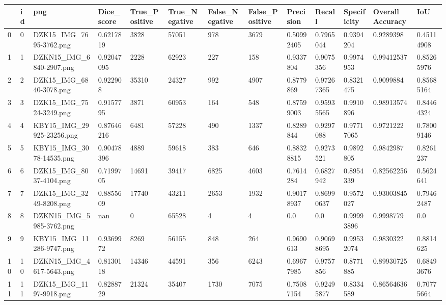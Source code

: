 \documentclass[11pt, a4paper, twoside]{report}
\begin{document}
\begin{longtable}[c]{@{}lllllllllllll@{}}
\toprule
 & id & png & Dice\_score & True\_Positive & True\_Negative & False\_Negative & False\_Positive & Precision & Recall & Specificity & Overall Accuracy & IoU \\* \midrule
\endhead
%
\bottomrule
\endfoot
%
\endlastfoot
%
0 & 0 & DZK15\_IMG\_7695-3762.png & 0.6217819 & 3828 & 57051 & 978 & 3679 & 0.50992405 & 0.7965044 & 0.9394204 & 0.9289398 & 0.45114908 \\
1 & 1 & DZKN15\_IMG\_6840-2907.png & 0.92047095 & 2228 & 62923 & 227 & 158 & 0.9337804 & 0.9075356 & 0.9974953 & 0.99412537 & 0.85265976 \\
2 & 2 & DZK15\_IMG\_6840-3078.png & 0.922908 & 35310 & 24327 & 992 & 4907 & 0.8779869 & 0.97267365 & 0.8321475 & 0.9099884 & 0.85685164 \\
3 & 3 & DZK15\_IMG\_7524-3249.png & 0.9157795 & 3871 & 60953 & 164 & 548 & 0.87599003 & 0.95935565 & 0.9910896 & 0.98913574 & 0.84464324 \\
4 & 4 & KBY15\_IMG\_29925-23256.png & 0.87646216 & 6481 & 57228 & 490 & 1337 & 0.8289844 & 0.9297088 & 0.97717065 & 0.9721222 & 0.78009146 \\
5 & 5 & KBY15\_IMG\_3078-14535.png & 0.90478396 & 4889 & 59618 & 383 & 646 & 0.88328815 & 0.9273521 & 0.9892805 & 0.9842987 & 0.8261237 \\
6 & 6 & DZK15\_IMG\_8037-4104.png & 0.7199705 & 14691 & 39417 & 6825 & 4603 & 0.7614284 & 0.6827942 & 0.8954339 & 0.82562256 & 0.5624641 \\
7 & 7 & DZK15\_IMG\_3249-8208.png & 0.8855609 & 17740 & 43211 & 2653 & 1932 & 0.90178937 & 0.86990637 & 0.9572027 & 0.93003845 & 0.79462487 \\
8 & 8 & DZKN15\_IMG\_5985-3762.png & nan & 0 & 65528 & 4 & 4 & 0.0 & 0.0 & 0.99993896 & 0.9998779 & 0.0 \\
9 & 9 & KBY15\_IMG\_11286-9747.png & 0.9369972 & 8269 & 56155 & 848 & 264 & 0.9690613 & 0.90698695 & 0.99532074 & 0.9830322 & 0.8814625 \\
10 & 10 & DZKN15\_IMG\_4617-5643.png & 0.8130118 & 14346 & 44591 & 356 & 6243 & 0.69677985 & 0.9757856 & 0.8771885 & 0.89930725 & 0.68493676 \\
11 & 11 & DZK15\_IMG\_1197-9918.png & 0.8288729 & 21324 & 35407 & 1730 & 7075 & 0.75087154 & 0.92495877 & 0.8334589 & 0.86564636 & 0.70775664 \\

\end{longtable}
\end{document}
